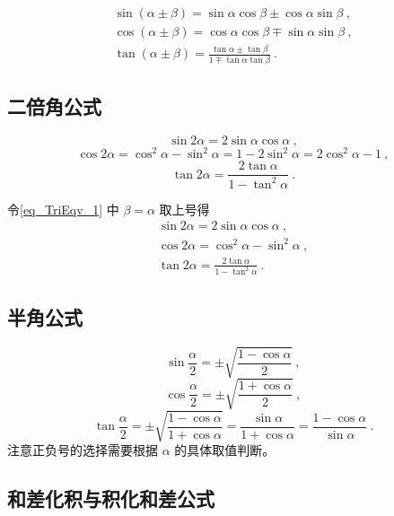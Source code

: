 \begin{gather}
\sin(\alpha\pm \beta) = \sin \alpha\cos \beta \pm \cos \alpha\sin \beta~,\\
\cos(\alpha\pm \beta) = \cos \alpha\cos \beta \mp \sin \alpha\sin \beta~,\\
\tan(\alpha\pm \beta) = \displaystyle\frac{\tan \alpha \pm \tan \beta}{1 \mp \tan \alpha \tan \beta}~.
\end{gather}


\subsection{二倍角公式}
\begin{equation}
\sin2\alpha = 2\sin\alpha \cos\alpha ~,
\end{equation}
\begin{equation}
\cos2\alpha = \cos^2\alpha - \sin^2\alpha = 1 - 2\sin^2\alpha = 2\cos^2\alpha -1~,
\end{equation}
\begin{equation}
\tan2\alpha = \frac{2\tan\alpha}{1-\tan^2\alpha}~.
\end{equation}

令\autoref{eq_TriEqv_1} 中 $\beta=\alpha$ 取上号得
\begin{gather}
\sin 2\alpha = 2\sin \alpha\cos \alpha~,\\
\cos 2\alpha = \cos^2 \alpha - \sin^2 \alpha~,\\
\tan 2\alpha = \frac{2\tan \alpha}{1 - \tan^2 \alpha}~.
\end{gather}

\subsection{半角公式}
\begin{equation}
\sin\frac{\alpha}{2} = \pm\sqrt{\frac{1-\cos\alpha}{2}}~,
\end{equation}
\begin{equation}
\cos\frac{\alpha}{2}= \pm\sqrt{\frac{1+\cos\alpha}{2}}~,
\end{equation}
\begin{equation}
\tan\frac{\alpha}{2} = \pm\sqrt{\frac{1-\cos\alpha}{1+\cos\alpha}} = \frac{\sin\alpha}{1+\cos\alpha} = \frac{1-\cos\alpha}{\sin\alpha}~.
\end{equation}
注意正负号的选择需要根据 $\alpha$ 的具体取值判断。


\subsection{和差化积与积化和差公式}

